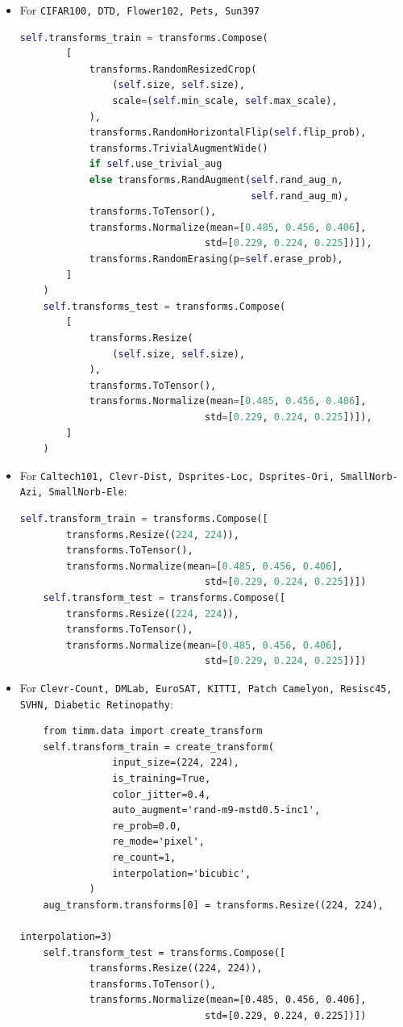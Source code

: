 \begin{itemize}
    \item For \texttt{CIFAR100, DTD, Flower102, Pets, Sun397}

\begin{lstlisting}[language=Python]
     self.transforms_train = transforms.Compose(
        [
            transforms.RandomResizedCrop(
                (self.size, self.size),
                scale=(self.min_scale, self.max_scale),
            ),
            transforms.RandomHorizontalFlip(self.flip_prob),
            transforms.TrivialAugmentWide()
            if self.use_trivial_aug
            else transforms.RandAugment(self.rand_aug_n, 
                                        self.rand_aug_m),
            transforms.ToTensor(),
            transforms.Normalize(mean=[0.485, 0.456, 0.406], 
                                std=[0.229, 0.224, 0.225])]),
            transforms.RandomErasing(p=self.erase_prob),
        ]
    )
    self.transforms_test = transforms.Compose(
        [
            transforms.Resize(
                (self.size, self.size),
            ),
            transforms.ToTensor(),
            transforms.Normalize(mean=[0.485, 0.456, 0.406], 
                                std=[0.229, 0.224, 0.225])]),
        ]
    )
\end{lstlisting}
\item For \texttt{Caltech101, Clevr-Dist, Dsprites-Loc, Dsprites-Ori, SmallNorb-Azi, SmallNorb-Ele}:

\begin{lstlisting}[language=Python]
    self.transform_train = transforms.Compose([
        transforms.Resize((224, 224)),
        transforms.ToTensor(),
        transforms.Normalize(mean=[0.485, 0.456, 0.406], 
                                std=[0.229, 0.224, 0.225])])
    self.transform_test = transforms.Compose([
        transforms.Resize((224, 224)),
        transforms.ToTensor(),
        transforms.Normalize(mean=[0.485, 0.456, 0.406], 
                                std=[0.229, 0.224, 0.225])])
\end{lstlisting}
\item For \texttt{Clevr-Count, DMLab, EuroSAT, KITTI, Patch Camelyon, Resisc45, SVHN, Diabetic Retinopathy}: 
\begin{lstlisting}
    from timm.data import create_transform
    self.transform_train = create_transform(
                input_size=(224, 224),
                is_training=True,
                color_jitter=0.4,
                auto_augment='rand-m9-mstd0.5-inc1',
                re_prob=0.0,
                re_mode='pixel',
                re_count=1,
                interpolation='bicubic',
            )
    aug_transform.transforms[0] = transforms.Resize((224, 224), 
                                                    interpolation=3)
    self.transform_test = transforms.Compose([
            transforms.Resize((224, 224)),
            transforms.ToTensor(),
            transforms.Normalize(mean=[0.485, 0.456, 0.406], 
                                std=[0.229, 0.224, 0.225])])
\end{lstlisting}
\end{itemize}

%